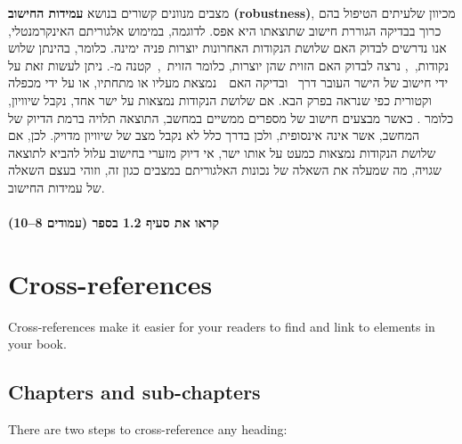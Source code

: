 \documentclass[
]{book}
\theoremstyle{definition}
\theoremstyle{definition}
\theoremstyle{definition}
\theoremstyle{definition}
\theoremstyle{remark}
\begin{document}
מצבים מנוונים קשורים בנושא \textbf{עמידות החישוב (robustness)}, מכיוון שלעיתים הטיפול בהם כרוך בבדיקה הגוררת חישוב שתוצאתו היא אפס. לדוגמה, במימוש אלגוריתם האינקרמנטלי, אנו נדרשים לבדוק האם שלושת הנקודות האחרונות יוצרות פניה ימינה. כלומר, בהינתן שלוש נקודות,~, נרצה לבדוק האם הזוית שהן יוצרות, כלומר הזוית~,~קטנה מ-. ניתן לעשות זאת על ידי חישוב של הישר העובר דרך ~ובדיקה האם~~נמצאת מעליו או מתחתיו, או על ידי מכפלה וקטורית כפי שנראה בפרק הבא. אם שלושת הנקודות נמצאות על ישר אחד, נקבל שיוויון, כלומר . כאשר מבצעים חישוב של מספרים ממשיים במחשב, התוצאה תלויה ברמת הדיוק של המחשב, אשר אינה אינסופית, ולכן בדרך כלל לא נקבל מצב של שיוויון מדויק. לכן, אם שלושת הנקודות נמצאות כמעט על אותו ישר, אי דיוק מזערי בחישוב עלול להביא לתוצאה שגויה, מה שמעלה את השאלה של נכונות האלגוריתם במצבים כגון זה, וזוהי בעצם השאלה של עמידות החישוב.

\hypertarget{ux5e7ux5e8ux5d0ux5d5-ux5d0ux5ea-ux5e1ux5e2ux5d9ux5e3-1.2-ux5d1ux5e1ux5e4ux5e8-ux5e2ux5deux5d5ux5d3ux5d9ux5dd-810}{%
\subsubsection{קראו את סעיף 1.2 בספר (עמודים 8--10)}\label{ux5e7ux5e8ux5d0ux5d5-ux5d0ux5ea-ux5e1ux5e2ux5d9ux5e3-1.2-ux5d1ux5e1ux5e4ux5e8-ux5e2ux5deux5d5ux5d3ux5d9ux5dd-810}}

\hypertarget{cross}{%
\chapter{Cross-references}\label{cross}}

Cross-references make it easier for your readers to find and link to elements in your book.

\hypertarget{chapters-and-sub-chapters}{%
\section{Chapters and sub-chapters}\label{chapters-and-sub-chapters}}

There are two steps to cross-reference any heading:
\end{document}
